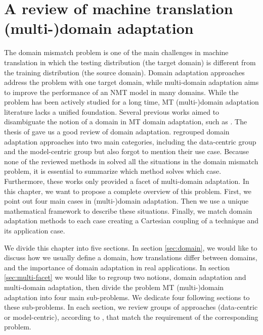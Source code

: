 \chapter{A review of machine translation (multi-)domain adaptation} \label{chap:mdmt-review}
The domain mismatch problem is one of the main challenges in machine translation \citep{koehn17six} in which the testing distribution (the target domain) is different from the training distribution (the source domain). Domain adaptation approaches address the problem with one target domain, while multi-domain adaptation aims to improve the performance of an NMT model in many domains. While the problem has been actively studied for a long time, MT (multi-)domain adaptation literature lacks a unified foundation. Several previous works aimed to disambiguate the notion of a domain in MT domain adaptation, such as \cite{Wees15Whats,Wees17Whats,Saunders21Domain}. The thesis of \cite{Saunders21Domain} gave us a good review of domain adaptation. \citet{Chu18asurvey} regrouped domain adaptation approaches into two main categories, including the data-centric group and the model-centric group but also forgot to mention their use case. Because none of the reviewed methods in \citet{Chu18asurvey} solved all the situations in the domain mismatch problem, it is essential to summarize which method solves which case. Furthermore, these works only provided a facet of multi-domain adaptation. In this chapter, we want to propose a complete overview of this problem. First, we point out four main cases in (multi-)domain adaptation. Then we use a unique mathematical framework to describe these situations. Finally, we match domain adaptation methods to each case creating a Cartesian coupling of a technique and its application case.

We divide this chapter into five sections. In section \ref{sec:domain}, we would like to discuss how we usually define a domain, how translations differ between domains, and the importance of domain adaptation in real applications. In section \ref{sec:multi-facet} we would like to regroup two notions, domain adaptation and multi-domain adaptation, then divide the problem MT (multi-)domain adaptation into four main sub-problems. We dedicate four following sections to these sub-problems. In each section, we review groups of approaches (data-centric or model-centric), according to \citet{Chu18survey}, that match the requirement of the corresponding problem.
